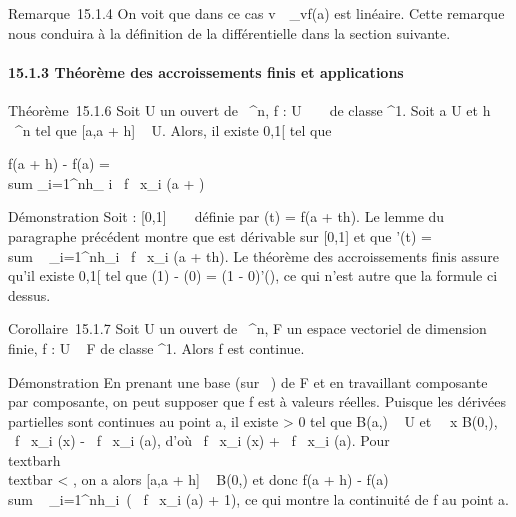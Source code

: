\documentclass[]{article}
\begin{document}
Remarque~15.1.4 On voit que dans ce cas
v\mapsto~\partial~\_vf(a) est linéaire. Cette
remarque nous conduira à la définition de la différentielle dans la
section suivante.

\paragraph{15.1.3 Théorème des accroissements finis et applications}

Théorème~15.1.6 Soit U un ouvert de ~^n, f : U \rightarrow~ ~ de classe
^1. Soit a \in U et h \in {}~^n tel que {[}a,a + h{]} \subset~
U. Alors, il existe \theta \in{]}0,1{[} tel que

f(a + h) - f(a) = \\sum
\_i=1^nh\_ i \partial~f \over
\partial~x\_i (a + \thetah)

Démonstration Soit \psi : {[}0,1{]} \rightarrow~ ~ définie par \psi(t) = f(a + th). Le
lemme du paragraphe précédent montre que \psi est dérivable sur {[}0,1{]}
et que \psi'(t) = \\sum ~
\_i=1^nh\_i \partial~f \over
\partial~x\_i (a + th). Le théorème des accroissements finis assure
qu'il existe \theta \in{]}0,1{[} tel que \psi(1) - \psi(0) = (1 - 0)\psi'(\theta), ce qui
n'est autre que la formule ci dessus.

Corollaire~15.1.7 Soit U un ouvert de ~^n, F un espace
vectoriel de dimension finie, f : U \rightarrow~ F de classe ^1. Alors
f est continue.

Démonstration En prenant une base (sur ~) de F et en travaillant
composante par composante, on peut supposer que f est à valeurs réelles.
Puisque les dérivées partielles sont continues au point a, il existe \eta
\textgreater{} 0 tel que B(a,\eta) \subset~ U et \forall~~x \in
B(0,\eta), \textbar{} \partial~f \over \partial~x\_i (x) - \partial~f
\over \partial~x\_i (a)\textbar{}, d'où \textbar{}
\partial~f \over \partial~x\_i (x)\textbar{} + \textbar{}
\partial~f \over \partial~x\_i (a)\textbar{}. Pour
\\textbar{}h\\textbar{} \textless{} \eta, on
a alors {[}a,a + h{]} \subset~ B(0,\eta) et donc \textbar{}f(a + h) -
f(a)\textbar{}\leq\\sum ~
\_i=1^n\textbar{}h\_i\textbar{}\,\left
(\left \textbar{} \partial~f \over
\partial~x\_i (a)\right \textbar{} +
1\right ), ce qui montre la continuité de f au point a.
\end{document}
